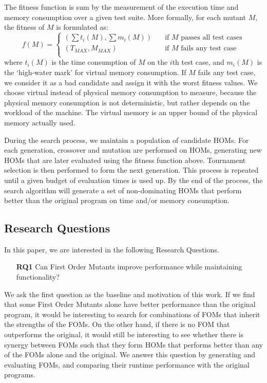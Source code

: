 \documentclass[oribibl]{llncs}
\begin{document}
The fitness function is sum by the measurement of the execution time and memory consumption over a given test suite.
More formally, for each mutant $M$, the fitness of $M$ is formulated as:
$$f(M)=
\begin{cases}
    (\sum t_i(M), \sum m_i(M))       & \quad \text{if } M \text{ passes all test cases}\\
    (T_{MAX}, M_{MAX})  & \quad \text{if } M \text{ fails any test case}\\
\end{cases}
$$
where $t_i(M)$ is the time consumption of $M$ on the $i$th test case, and $m_i(M)$ is the `high-water mark' for virtual memory consumption.
If $M$ fails any test case, we consider it as a bad candidate and assign it with the worst fitness values.
We choose virtual instead of physical memory consumption to measure, because the physical memory consumption is not deterministic, but rather depends on the workload of the machine.
The virtual memory is an upper bound of the physical memory actually used.

During the search process, we maintain a population of candidate HOMs.
For each generation, crossover and mutation are performed on HOMs, generating new HOMs that are later evaluated using the fitness function above.
Tournament selection is then performed to form the next generation.
This process is repeated until a given budget of evaluation times is used up.
By the end of the process, the search algorithm will generate a set of non-dominating HOMs that perform better than the original program on time and/or memory consumption.

\subsection{Research Questions}
\label{sec_rq}

In this paper, we are interested in the following Research Questions.

\begin{enumerate}
\item[\textbf{RQ1}] Can First Order Mutants improve performance while maintaining functionality?
\end{enumerate}

We ask the first question as the baseline and motivation of this work.
If we find that some First Order Mutants alone have better performance than the original program, it would be interesting to search for combinations of FOMs that inherit the strengths of the FOMs.
On the other hand, if there is no FOM that outperforms the original, it would still be interesting to see whether there is synergy between FOMs such that they form HOMs that performs better than any of the FOMs alone and the original.
We answer this question by generating and evaluating FOMs, and comparing their runtime performance with the original programs.
\end{document}

